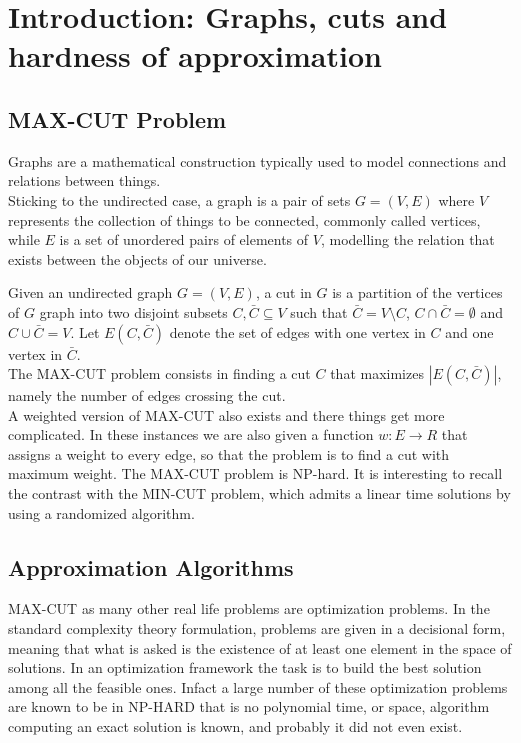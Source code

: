 \section{Introduction: Graphs, cuts and hardness of approximation}

\subsection{MAX-CUT Problem}
Graphs are a mathematical construction typically used to model connections and relations between things. \\
Sticking to the undirected case, a graph is a pair of sets $G=(V,E)$ where $V$ represents the collection of things to be connected, commonly called vertices, while $E$ is a set of unordered pairs of elements of $V$, modelling the relation that exists between the objects of our universe.

Given an undirected graph $G = (V,E)$, a cut in $G$ is a partition of the vertices of $ G $ graph into two disjoint subsets $ C,\bar{C} \subseteq V$ such that $\bar{C} = V \setminus C $, $ C \cap \bar{C} = \emptyset$ and $ C \cup \bar{C} = V $.
Let $E(C,\bar{C})$ denote the set of edges with one vertex in $C$ and one vertex in $\bar{C}$. \\
The MAX-CUT problem consists in finding a cut $C$ that maximizes $|E(C,\bar{C})|$, namely the number of edges crossing the cut. \\
A weighted version of MAX-CUT also exists and there things get more complicated.	
In these instances we are also given a function $w : E \rightarrow R$ that assigns a weight to every edge, so that the problem is to find a cut with maximum weight. The MAX-CUT problem is NP-hard.
It is interesting to recall the contrast with the MIN-CUT problem, which admits a linear time solutions by using a randomized algorithm.

\subsection{Approximation Algorithms}
MAX-CUT as many other real life problems are optimization problems.
In the standard complexity theory formulation, problems are given in a decisional form, meaning that what is asked is the existence of at least one element in the space of solutions.
In an optimization framework the task is to build the best solution among all the feasible ones.
Infact a large number of these optimization problems are known to be in NP-HARD that is no polynomial time, or space, algorithm computing an exact solution is known, and probably it did not even exist.\\


